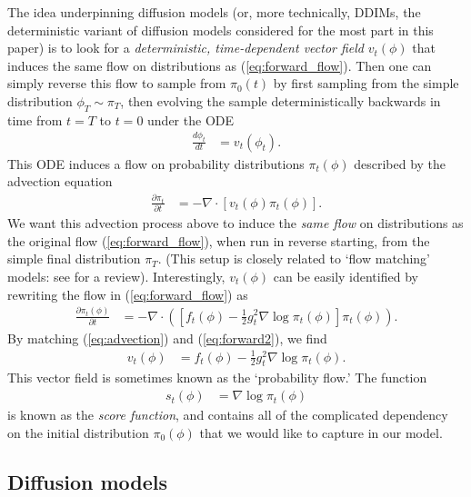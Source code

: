 \documentclass{article}
\theoremstyle{plain}
\theoremstyle{definition}
\theoremstyle{remark}
\begin{document}
The idea underpinning diffusion models (or, more technically, DDIMs, the deterministic variant of diffusion models considered for the most part in this paper) is to look for a \textit{deterministic, time-dependent vector field} $v_t(\phi)$ that induces the same flow on distributions as (\ref{eq:forward_flow}). Then one can simply reverse this flow to sample from $\pi_0(t)$ by first sampling from the simple distribution $\phi_T \sim \pi_T$, then evolving the sample deterministically backwards in time from $t = T$ to $t = 0$ under the ODE
\begin{align}
    \frac{d \phi_t}{dt} &= v_t(\phi_t).
\end{align}
This ODE induces a flow on probability distributions $\pi_t(\phi)$ described by the advection equation
\begin{align}\label{eq:advection}
    \frac{\partial \pi_t}{\partial t} &= -\nabla \cdot [v_t(\phi) \pi_t(\phi)].
\end{align}
We want this advection process above to induce the \textit{same flow} on distributions as the original flow (\ref{eq:forward_flow}), when run in reverse starting, from the simple final distribution $\pi_{T}$. (This setup is closely related to `flow matching' models: see \cite{lipman2022flow} for a review). Interestingly, $v_t(\phi)$ can be easily identified by rewriting the flow in (\ref{eq:forward_flow}) as
\begin{align}\label{eq:forward2}
    \frac{\partial \pi_t(\phi)}{\partial t} &= -\nabla \cdot([f_t(\phi) - \frac{1}{2} g_t^2 \nabla \log \pi_t(\phi)]\pi_t(\phi)).
\end{align}
By matching (\ref{eq:advection}) and (\ref{eq:forward2}), we find 
\begin{align}
    v_t(\phi) &= f_t(\phi) - \frac{1}{2} g_t^2 \nabla \log \pi_t(\phi).
\end{align}
This vector field is sometimes known as the `probability flow.' The function
\begin{align}
    s_t(\phi) &= \nabla \log \pi_t(\phi)
\end{align}
is known as the \textit{score function}, and contains all of the complicated dependency on the initial distribution $\pi_0(\phi)$ that we would like to capture in our model.

\subsection{Diffusion models}
\end{document}
